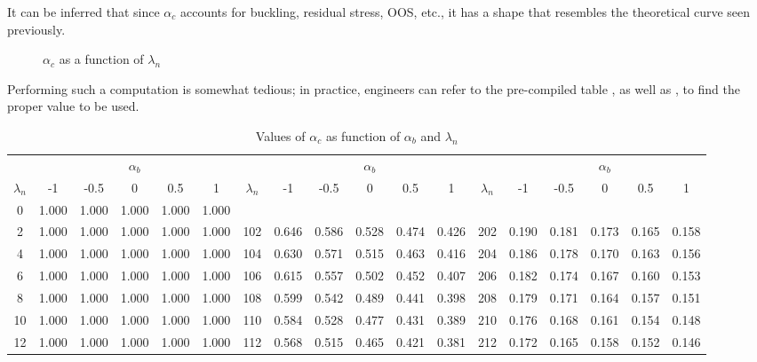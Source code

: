 It can be inferred that since $\alpha_c$ accounts for buckling, residual stress, OOS, etc., it has a shape that resembles the theoretical curve seen previously.
\begin{figure}[H]
\centering

\caption{$\alpha_c$ as a function of $\lambda_n$}\label{fig:alpha_c}
\end{figure}

Performing such a computation is somewhat tedious; in practice, engineers can refer to the pre-compiled table , as well as , to find the proper value to be used.
\begin{table}[H]
\centering\scriptsize\setlength{\tabcolsep}{4pt}\renewcommand{\arraystretch}{1.03}
\caption{Values of $\alpha_c$ as function of $\alpha_b$ and $\lambda_n$}\label{tab:alpha_c}
\begin{tabular}{c|ccccc|c|ccccc|c|ccccc}
	\toprule
	            &    \multicolumn{5}{c|}{$\alpha_b$}    &             &    \multicolumn{5}{c|}{$\alpha_b$}    &             &    \multicolumn{5}{c}{$\alpha_b$}     \\
	$\lambda_n$ &  -1   & -0.5  &   0   &  0.5  &   1   & $\lambda_n$ &  -1   & -0.5  &   0   &  0.5  &   1   & $\lambda_n$ &  -1   & -0.5  &   0   &  0.5  &   1   \\ \midrule
	     0      & 1.000 & 1.000 & 1.000 & 1.000 & 1.000 &             &       &       &       &       &       &             &       &       &       &       &       \\
	     2      & 1.000 & 1.000 & 1.000 & 1.000 & 1.000 &     102     & 0.646 & 0.586 & 0.528 & 0.474 & 0.426 &     202     & 0.190 & 0.181 & 0.173 & 0.165 & 0.158 \\
	     4      & 1.000 & 1.000 & 1.000 & 1.000 & 1.000 &     104     & 0.630 & 0.571 & 0.515 & 0.463 & 0.416 &     204     & 0.186 & 0.178 & 0.170 & 0.163 & 0.156 \\
	     6      & 1.000 & 1.000 & 1.000 & 1.000 & 1.000 &     106     & 0.615 & 0.557 & 0.502 & 0.452 & 0.407 &     206     & 0.182 & 0.174 & 0.167 & 0.160 & 0.153 \\
	     8      & 1.000 & 1.000 & 1.000 & 1.000 & 1.000 &     108     & 0.599 & 0.542 & 0.489 & 0.441 & 0.398 &     208     & 0.179 & 0.171 & 0.164 & 0.157 & 0.151 \\
	    10      & 1.000 & 1.000 & 1.000 & 1.000 & 1.000 &     110     & 0.584 & 0.528 & 0.477 & 0.431 & 0.389 &     210     & 0.176 & 0.168 & 0.161 & 0.154 & 0.148 \\
	    12      & 1.000 & 1.000 & 1.000 & 1.000 & 1.000 &     112     & 0.568 & 0.515 & 0.465 & 0.421 & 0.381 &     212     & 0.172 & 0.165 & 0.158 & 0.152 & 0.146 \\

\end{tabular}
\end{table}
